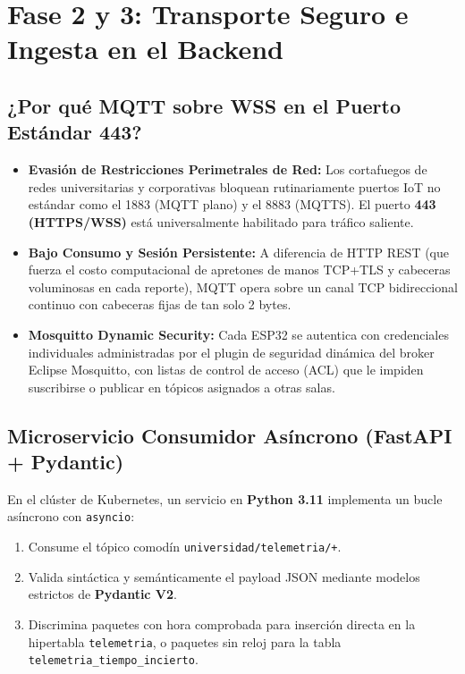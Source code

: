 \documentclass[11pt,a4paper]{article}
\begin{document}
\section{Fase 2 y 3: Transporte Seguro e Ingesta en el Backend}

\subsection{¿Por qué MQTT sobre WSS en el Puerto Estándar 443?}
\begin{itemize}
    \item \textbf{Evasión de Restricciones Perimetrales de Red:} Los cortafuegos de redes universitarias y corporativas bloquean rutinariamente puertos IoT no estándar como el 1883 (MQTT plano) y el 8883 (MQTTS). El puerto \textbf{443 (HTTPS/WSS)} está universalmente habilitado para tráfico saliente.
    \item \textbf{Bajo Consumo y Sesión Persistente:} A diferencia de HTTP REST (que fuerza el costo computacional de apretones de manos TCP+TLS y cabeceras voluminosas en cada reporte), MQTT opera sobre un canal TCP bidireccional continuo con cabeceras fijas de tan solo 2 bytes.
    \item \textbf{Mosquitto Dynamic Security:} Cada ESP32 se autentica con credenciales individuales administradas por el plugin de seguridad dinámica del broker Eclipse Mosquitto, con listas de control de acceso (ACL) que le impiden suscribirse o publicar en tópicos asignados a otras salas.
\end{itemize}

\subsection{Microservicio Consumidor Asíncrono (FastAPI + Pydantic)}
En el clúster de Kubernetes, un servicio en \textbf{Python 3.11} implementa un bucle asíncrono con \texttt{asyncio}:
\begin{enumerate}
    \item Consume el tópico comodín \texttt{universidad/telemetria/+}.
    \item Valida sintáctica y semánticamente el payload JSON mediante modelos estrictos de \textbf{Pydantic V2}.
    \item Discrimina paquetes con hora comprobada para inserción directa en la hipertabla \texttt{telemetria}, o paquetes sin reloj para la tabla \texttt{telemetria\_tiempo\_incierto}.
\end{enumerate}
\end{document}

